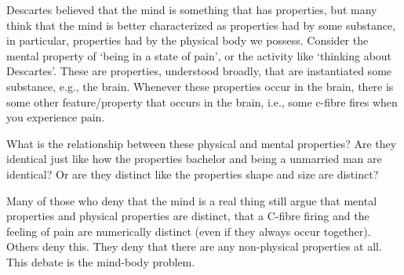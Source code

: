 \documentclass[]{article}
\begin{document}
Descartes believed that the mind is something that has properties, but
many think that the mind is better characterized as properties had by
some substance, in particular, properties had by the physical body we
possess. Consider the mental property of `being in a state of pain', or
the activity like `thinking about Descartes'. These are properties,
understood broadly, that are instantiated some substance, e.g., the
brain. Whenever these properties occur in the brain, there is some other
feature/property that occurs in the brain, i.e., some c-fibre fires when
you experience pain.

What is the relationship between these physical and mental properties?
Are they identical just like how the properties bachelor and being a
unmarried man are identical? Or are they distinct like the properties
shape and size are distinct?

Many of those who deny that the mind is a real thing still argue that
mental properties and physical properties are distinct, that a C-fibre
firing and the feeling of pain are numerically distinct (even if they
always occur together). Others deny this. They deny that there are any
non-physical properties at all. This debate is the mind-body problem.
\end{document}
